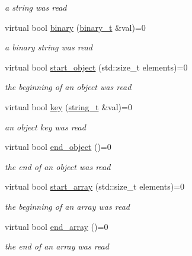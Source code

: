 \begin{DoxyCompactItemize}
\begin{DoxyCompactList}\small\item\em a string was read \end{DoxyCompactList}\item 
virtual bool \hyperlink{structnlohmann_1_1json__sax_a38c2dbde07138cc436ea7fbf22c1e92d}{binary} (\hyperlink{structnlohmann_1_1json__sax_a0ef406ba81eef08aadf4a9ef48d742bd}{binary\+\_\+t} \&val)=0
\begin{DoxyCompactList}\small\item\em a binary string was read \end{DoxyCompactList}\item 
virtual bool \hyperlink{structnlohmann_1_1json__sax_a0671528b0debb5a348169d61f0382a0f}{start\+\_\+object} (std\+::size\+\_\+t elements)=0
\begin{DoxyCompactList}\small\item\em the beginning of an object was read \end{DoxyCompactList}\item 
virtual bool \hyperlink{structnlohmann_1_1json__sax_a2e0c7ecd80b18d18a8cc76f71cfc2028}{key} (\hyperlink{structnlohmann_1_1json__sax_ae01977a9f3c5b3667b7a2929ed91061e}{string\+\_\+t} \&val)=0
\begin{DoxyCompactList}\small\item\em an object key was read \end{DoxyCompactList}\item 
virtual bool \hyperlink{structnlohmann_1_1json__sax_ad0c722d53ff97be700ccf6a9468bd456}{end\+\_\+object} ()=0
\begin{DoxyCompactList}\small\item\em the end of an object was read \end{DoxyCompactList}\item 
virtual bool \hyperlink{structnlohmann_1_1json__sax_a5c53878cf08d463eb4e7ca0270532572}{start\+\_\+array} (std\+::size\+\_\+t elements)=0
\begin{DoxyCompactList}\small\item\em the beginning of an array was read \end{DoxyCompactList}\item 
virtual bool \hyperlink{structnlohmann_1_1json__sax_a235ee975617f28e6a996d1e36a282312}{end\+\_\+array} ()=0
\begin{DoxyCompactList}\small\item\em the end of an array was read \end{DoxyCompactList}\item 

\end{DoxyCompactItemize}
